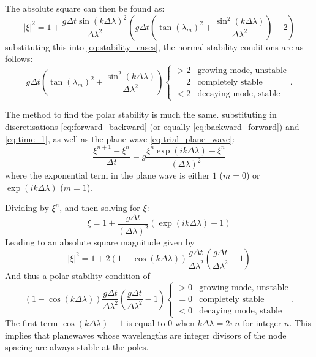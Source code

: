 \documentclass[12pt, onecolumn]{revtex4-2}    %
\begin{document}
The absolute square can then be found as:
\begin{equation*}
    |\xi|^2 = 1 + \frac{g \Delta t \sin(k\Delta\lambda)^2}{\Delta \lambda^2}\left(g\Delta t\left(\tan(\lambda_m)^2 + \frac{\sin^2(k\Delta\lambda)}{\Delta\lambda^2}\right) - 2 \right)
\end{equation*}
substituting this into \eqref{eq:stability_cases}, the normal stability conditions are as follows:
\begin{equation}\label{appeq:normalstability}
    g\Delta t\left(\tan(\lambda_m)^2 + \frac{\sin^2(k\Delta\lambda)}{\Delta\lambda^2}\right)
    \begin{cases}
        > 2 & \text{growing mode, unstable} \\
        = 2 & \text{completely stable}      \\
        < 2 & \text{decaying mode, stable}
    \end{cases}
    .
\end{equation}


The method to find the polar stability is much the same.
substituting in discretisations \eqref{eq:forward_backward} (or equally \eqref{eq:backward_forward}) and \eqref{eq:time_1}, as well as the plane wave \eqref{eq:trial_plane_wave}:
\begin{equation*}
    \frac{\xi^{n+1} - \xi^{n}}{\Delta t} = g\frac{\xi^n \exp(i k \Delta\lambda) - \xi^n}{(\Delta\lambda)^2}
\end{equation*}
where the exponential term in the plane wave is either $1$ ($m=0$) or $\exp(i k \Delta\lambda)$ ($m=1$).

Dividing by $\xi^n$, and then solving for $\xi$:
\begin{equation*}
    \xi = 1 + \frac{g\Delta t}{(\Delta \lambda)^2}\left(\exp(i k \Delta \lambda) - 1\right)
\end{equation*}
Leading to an absolute square magnitude given by
\begin{equation*}
    |\xi|^2 = 1 + 2 (1-\cos(k\Delta\lambda)) \frac{g \Delta t}{\Delta \lambda ^2}\left(\frac{g\Delta t}{\Delta \lambda ^2} - 1\right)
\end{equation*}
And thus a polar stability condition of
\begin{equation*}
    (1-\cos(k\Delta\lambda)) \frac{g \Delta t}{\Delta \lambda ^2}\left(\frac{g\Delta t}{\Delta \lambda ^2} - 1\right)
    \begin{cases}
        > 0 & \text{growing mode, unstable} \\
        = 0 & \text{completely stable}      \\
        < 0 & \text{decaying mode, stable}
    \end{cases}
    .
\end{equation*}
The first term $\cos(k\Delta\lambda) - 1$ is equal to $0$ when $k\Delta\lambda = 2\pi n$ for integer $n$.
This implies that planewaves whose wavelengths are integer divisors of the node spacing are always stable at the poles.
\end{document}
